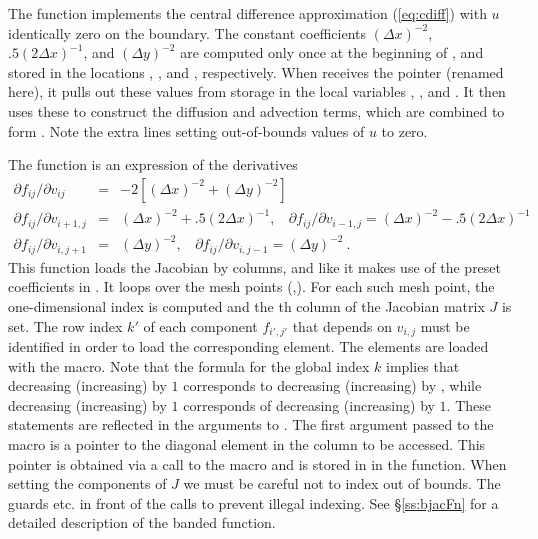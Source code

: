The  function implements the central difference approximation
(\ref{eq:cdiff}) with $u$ identically zero on the boundary. 
The constant coefficients $(\Delta x)^{-2}$, $.5(2 \Delta x)^{-1}$, and 
$(\Delta y)^{-2}$ are computed only once at the beginning of , 
and stored in the locations , , and
, respectively.   When  receives the 
pointer (renamed  here), it pulls out these values from storage
in the local variables , , and .  It then
uses these to construct the diffusion and advection terms, which are
combined to form .  Note the extra lines setting out-of-bounds
values of $u$ to zero.

The  function is an expression of the derivatives
\begin{eqnarray*}
\partial f_{ij} / \partial v_{ij} &=&
         -2 [(\Delta x)^{-2} + (\Delta y)^{-2}] \\
\partial f_{ij} / \partial v_{i+1,j} &=& (\Delta x)^{-2} 
                  + .5 (2 \Delta x)^{-1}, ~~~~
\partial f_{ij} / \partial v_{i-1,j}  =  (\Delta x)^{-2} 
                  - .5 (2 \Delta x)^{-1} \\
\partial f_{ij} / \partial v_{i,j+1} &=& (\Delta y)^{-2}, ~~~~
\partial f_{ij} / \partial v_{i,j-1}  =  (\Delta y)^{-2} ~. 
\end{eqnarray*}
This function loads the Jacobian by columns, and like  it
makes use of the preset coefficients in .
It loops over the mesh points (,). For each such mesh
point, the one-dimensional index  is computed
and the th column of the Jacobian matrix $J$ is set. 
The row index $k'$ of each component $f_{i',j'}$ that depends on
$v_{i,j}$ must be identified in order to load the corresponding element.
The elements are loaded with the  macro.
Note that the formula for the global index $k$ implies that decreasing 
(increasing)  by $1$ corresponds to decreasing (increasing) 
 by , while decreasing (increasing)  by $1$ 
corresponds of decreasing (increasing)  by $1$. 
These statements are reflected in the arguments to . 
The first argument passed to the  macro is a pointer to
the diagonal element in the column to be accessed. This pointer is obtained
via a call to the  macro and is stored in  in
the  function. When setting the components of $J$ we must be
careful not to index out of bounds. The guards  etc.
in front of the calls to  prevent illegal indexing.
See \S\ref{ss:bjacFn} for a detailed description of the banded 
function.

